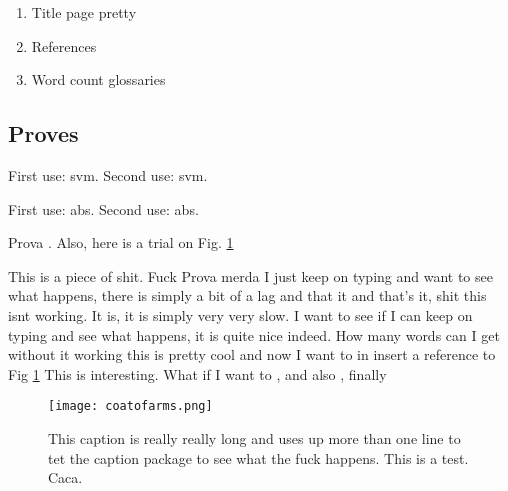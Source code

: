 
\begin{enumerate}

\item Title page pretty

\item References

\item Word count glossaries

\end{enumerate}


\subsection{Proves}

First use: \gls{svm}. Second use: \gls{svm}.

First use: \gls{abs}. Second use: \gls{abs}.

Prova \cite{mike}. Also, here is a trial on Fig. \ref{caca}


This is a piece of shit. Fuck Prova merda I just keep on typing and want to see what happens, there is simply a bit of a lag and that it and that's it, shit this isnt working. It is, it is simply very very slow. I want to see if I can keep on typing and see what happens, it is quite nice indeed. How many words can I get without it working this is pretty cool and now I want to in insert a reference to Fig \ref{caca} This is interesting. What if I want to \cite{mike}, and also \cite{Higgs1964}, finally \cite{Nelder1965}

\begin{figure}[htbp]
\begin{center}
\texttt{[image: coatofarms.png]}
\caption{This caption is really really long and uses up more than one line to tet the caption package to see what the fuck happens. This is a test. Caca.}
\label{caca}
\end{center}
\end{figure}


\blindmathpaper